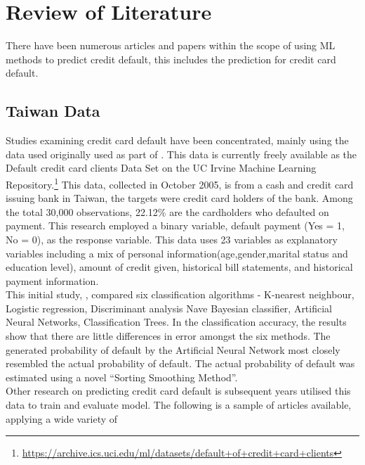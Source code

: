 \documentclass[
]{article}
\author{}
\date{\vspace{-2.5em}}
\begin{document}

\hypertarget{review-of-literature}{%
\section{Review of Literature}\label{review-of-literature}}

There have been numerous articles and papers within the scope of using
ML methods to predict credit default, this includes the prediction for
credit card default.

\hypertarget{taiwan-data}{%
\subsection{Taiwan Data}\label{taiwan-data}}

Studies examining credit card default have been concentrated, mainly
using the data used originally used as part of \citet{YEH20092473} .
This data is currently freely available as the Default credit card
clients Data Set on the UC Irvine Machine Learning
Repository.\footnote{\url{https://archive.ics.uci.edu/ml/datasets/default+of+credit+card+clients}}
This data, collected in October 2005, is from a cash and credit card
issuing bank in Taiwan, the targets were credit card holders of the
bank. Among the total 30,000 observations, 22.12\% are the cardholders
who defaulted on payment. This research employed a binary variable,
default payment (Yes = 1, No = 0), as the response variable. This data
uses 23 variables as explanatory variables including a mix of personal
information(age,gender,marital status and education level), amount of
credit given, historical bill statements, and historical payment
information.\\
This initial study, \citet{YEH20092473}, compared six classification
algorithms - K-nearest neighbour, Logistic regression, Discriminant
analysis Nave Bayesian classifier, Artificial Neural Networks,
Classification Trees. In the classification accuracy, the results show
that there are little differences in error amongst the six methods. The
generated probability of default by the Artificial Neural Network most
closely resembled the actual probability of default. The actual
probability of default was estimated using a novel ``Sorting Smoothing
Method''.\\
\vspace{.5 cm} Other research on predicting credit card default is
subsequent years utilised this data to train and evaluate model. The
following is a sample of articles available, applying a wide variety of
\end{document}
